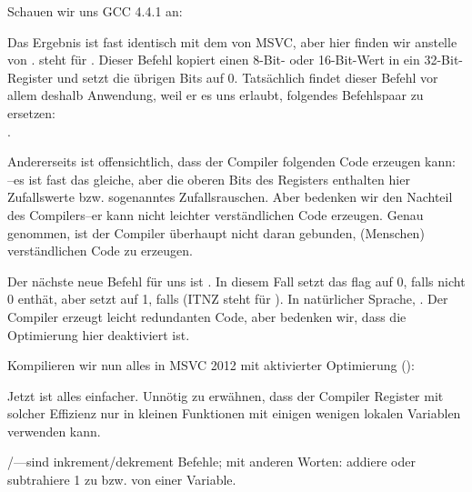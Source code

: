 
Schauen wir uns GCC 4.4.1 an:



\label{movzx}

Das Ergebnis ist fast identisch mit dem von MSVC, aber hier finden wir \MOVZX
anstelle von \MOVSX. 
\MOVZX steht für . 
Dieser Befehl kopiert einen 8-Bit- oder 16-Bit-Wert in ein 32-Bit-Register und
setzt die übrigen Bits auf 0.
Tatsächlich findet dieser Befehl vor allem deshalb Anwendung, weil er es uns
erlaubt, folgendes Befehlspaar zu ersetzen:\\
.

Andererseits ist offensichtlich, dass der Compiler folgenden Code erzeugen kann:
\\
--es ist fast das gleiche, aber die
oberen Bits des \EAX Registers enthalten hier Zufallswerte bzw.
sogenanntes Zufallsrauschen.
Aber bedenken wir den Nachteil des Compilers--er kann nicht leichter
verständlichen Code erzeugen. 
Genau genommen, ist der Compiler überhaupt nicht daran gebunden, (Menschen)
verständlichen Code zu erzeugen.


Der nächste neue Befehl für uns ist \SETNZ.
In diesem Fall setzt  das \ZF flag auf 0, falls \AL nicht 0
enthät, aber \SETNZ setzt \AL auf 1, falls  (IT{NZ} steht für
).
In natürlicher Sprache, . 
Der Compiler erzeugt leicht redundanten Code, aber bedenken wir, dass die
Optimierung hier deaktiviert ist.

\label{strlen_MSVC_Ox}

Kompilieren wir nun alles in MSVC 2012 mit aktivierter Optimierung (\Ox):



Jetzt ist alles einfacher.
Unnötig zu erwähnen, dass der Compiler Register mit solcher Effizienz nur in
kleinen Funktionen mit einigen wenigen lokalen Variablen verwenden kann.

\INC/\DEC---sind \gls{inkrement}/\gls{dekrement} Befehle; mit anderen Worten:
addiere oder subtrahiere 1 zu bzw. von einer Variable. 

